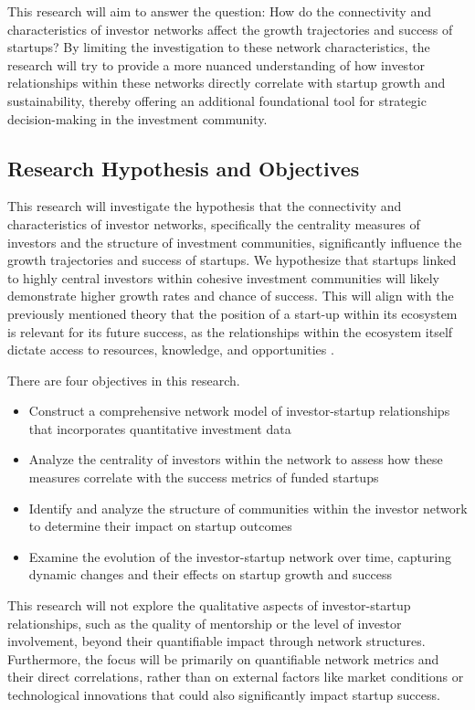 \documentclass[a4paper,11pt]{article}
\begin{document}
This research will aim to answer the question: How do the connectivity and characteristics of investor networks affect the growth trajectories and success of startups? By limiting the investigation to these network characteristics, the research will try to provide a more nuanced understanding of how investor relationships within these networks directly correlate with startup growth and sustainability, thereby offering an additional foundational tool for strategic decision-making in the investment community.

\subsection{Research Hypothesis and Objectives}
This research will investigate the hypothesis that the connectivity and characteristics of investor networks, specifically the centrality measures of investors and the structure of investment communities, significantly influence the growth trajectories and success of startups. We hypothesize that startups linked to highly central investors within cohesive investment communities will likely demonstrate higher growth rates and chance of success. This will align with the previously mentioned theory that the position of a start-up within its ecosystem is relevant for its future success, as the relationships within the ecosystem itself dictate access to resources, knowledge, and opportunities \cite{uzzi2021a}.

There are four objectives in this research. 
\begin{itemize}
    \item Construct a comprehensive network model of investor-startup relationships that incorporates quantitative investment data
    \item Analyze the centrality of investors within the network to assess how these measures correlate with the success metrics of funded startups
    \item Identify and analyze the structure of communities within the investor network to determine their impact on startup outcomes
    \item Examine the evolution of the investor-startup network over time, capturing dynamic changes and their effects on startup growth and success
\end{itemize}

This research will not explore the qualitative aspects of investor-startup relationships, such as the quality of mentorship or the level of investor involvement, beyond their quantifiable impact through network structures. Furthermore, the focus will be primarily on quantifiable network metrics and their direct correlations, rather than on external factors like market conditions or technological innovations that could also significantly impact startup success.
\end{document}
